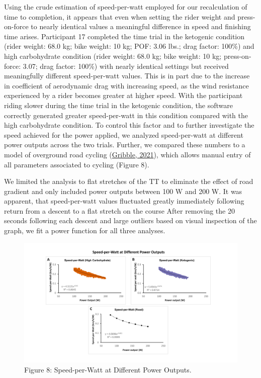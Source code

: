 \documentclass[]{cik}%
\begin{document}
Using the crude estimation of speed-per-watt employed for our
recalculation of time to completion, it appears that even when setting
the rider weight and press-on-force to nearly identical values a
meaningful difference in speed and finishing time arises. Participant 17
completed the time trial in the ketogenic condition (rider weight: 68.0
kg; bike weight: 10 kg; POF: 3.06 lbs.; drag factor: 100\%) and high
carbohydrate condition (rider weight: 68.0 kg; bike weight: 10 kg;
press-on-force: 3.07; drag factor: 100\%) with nearly identical settings
but received meaningfully different speed-per-watt values. This is in
part due to the increase in coefficient of aerodynamic drag with
increasing speed, as the wind resistance experienced by a rider becomes
greater at higher speed. With the participant riding slower during the
time trial in the ketogenic condition, the software correctly generated
greater speed-per-watt in this condition compared with the high
carbohydrate condition. To control this factor and to further
investigate the speed achieved for the power applied, we analyzed
speed-per-watt at different power outputs across the two trials.
Further, we compared these numbers to a model of overground road cycling
(\protect\hyperlink{ref-54}{Gribble, 2021}), which allows manual entry
of all parameters associated to cycling (Figure 8).

We limited the analysis to flat stretches of the TT to eliminate the
effect of road gradient and only included power outputs between 100 W
and 200 W. It was apparent, that speed-per-watt values fluctuated
greatly immediately following return from a descent to a flat stretch on
the course After removing the 20 seconds following each descent and
large outliers based on visual inspection of the graph, we fit a power
function for all three analyses.

\begin{figure}[H]
\includegraphics[width=1\linewidth]{figures/figure8} \caption{Figure 8: Speed-per-Watt at Different Power Outputs.}\label{fig:fig8pdf}
\end{figure}
\end{document}
